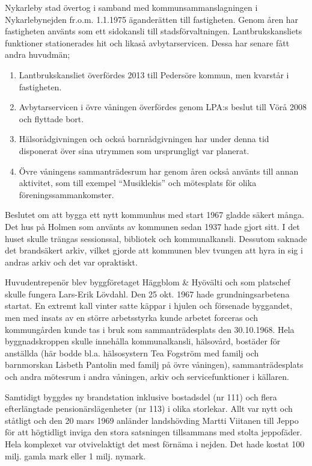 %
Nykarleby stad övertog i samband med kommunsammanslagningen i Nykarlebynejden fr.o.m. 1.1.1975 äganderätten till fastigheten. Genom åren har fastigheten använts som ett sidokansli till stadsförvaltningen. Lantbrukskansliets funktioner stationerades hit och likaså avbytarservicen. Dessa har senare fått andra huvudmän;
\begin{enumerate}
  \item Lantbrukskansliet överfördes 2013 till Pedersöre kommun, men kvarstår i fastigheten.
  \item Avbytarservicen i övre  våningen överfördes genom LPA:s beslut till Vörå 2008 och flyttade bort.
  \item Hälsorådgivningen och också barnrådgivningen har under denna tid disponerat över sina utrymmen som ursprungligt var planerat.
  \item Övre våningens sammanträdesrum har genom åren också använts till annan aktivitet, som till exempel ``Musiklekis'' och mötesplats för olika föreningssammankomster.
\end{enumerate}


%
Beslutet om att bygga ett nytt kommunhus med start 1967 gladde säkert många. Det hus på Holmen som använts av kommunen sedan 1937 hade gjort sitt. I det huset skulle trängas sessionssal, bibliotek och kommunalkansli. Dessutom saknade det brandsäkert arkiv, vilket gjorde att kommunen blev tvungen att hyra in sig i andras arkiv och det var opraktiskt.

Huvudentrepenör blev byggföretaget Häggblom \& Hyövälti och som platschef skulle fungera Lars-Erik Lövdahl. Den 25 okt. 1967 hade grundningsarbetena startat. En extremt kall vinter satte käppar i hjulen och försenade byggandet, men med insats av en större arbetsstyrka kunde arbetet forceras och kommungården kunde tas i bruk som sammanträdesplats den 30.10.1968. Hela byggnadskroppen skulle innehålla kommunalkansli, hälsovård, bostäder för anställda (här bodde bl.a. hälsosystern Tea Fogström med familj och barnmorskan Lisbeth Pantolin med familj på övre våningen), sammanträdesplats och andra mötesrum i andra våningen, arkiv och servicefunktioner i källaren.

Samtidigt byggdes ny brandstation inklusive bostadsdel (nr 111) och flera efterlängtade pensionärslägenheter (nr 113) i olika storlekar. Allt var nytt och ståtligt och den 20 mars 1969 anländer landshövding Martti Viitanen till Jeppo för att högtidligt inviga den stora satsningen tillsammans med stolta jeppofäder. Hela komplexet var otvivelaktigt det mest förnäma i nejden. Det hade kostat 100 milj. gamla mark eller 1 milj. nymark.



